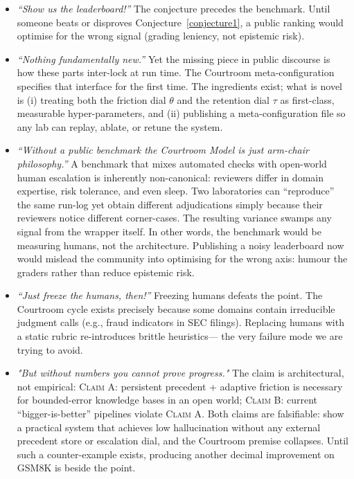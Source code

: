 \documentclass[11pt]{article}
\begin{document}
\begin{itemize}
\item \emph{“Show us the leaderboard!”} The conjecture precedes the benchmark. Until someone beats or disproves Conjecture~\ref{conjecture1}, a public ranking would optimise for the wrong signal (grading leniency, not epistemic risk).

\item \emph{“Nothing fundamentally new.”} Yet the missing piece in public discourse is how these parts inter-lock at run time. The Courtroom meta-configuration specifies that interface for the first time. The ingredients exist; what is novel is (i) treating both the friction dial $\theta$ and the retention dial $\tau$ as first-class, measurable hyper-parameters, and (ii) publishing a meta-configuration file so any lab can replay, ablate, or retune the system.

\item \emph{“Without a public benchmark the Courtroom Model is just arm-chair philosophy.”} A benchmark that mixes automated checks with open-world human escalation is inherently non-canonical: reviewers differ in domain expertise, risk tolerance, and even sleep. Two laboratories can “reproduce” the same run-log yet obtain different adjudications simply because their reviewers notice different corner-cases. The resulting variance swamps any signal from the wrapper itself. In other words, the benchmark would be measuring humans, not the architecture. Publishing a noisy leaderboard now would mislead the community into optimising for the wrong axis: humour the graders rather than reduce epistemic risk.

\item \emph{“Just freeze the humans, then!”} Freezing humans defeats the point. The Courtroom cycle exists precisely because some domains contain irreducible judgment calls (e.g., fraud indicators in SEC filings). Replacing humans with a static rubric re-introduces brittle heuristics— the very failure mode we are trying to avoid.

\item \emph{"But without numbers you cannot prove progress."} The claim is architectural, not empirical: \textsc{Claim A}: persistent precedent + adaptive friction is necessary for bounded-error knowledge bases in an open world; \textsc{Claim B}: current “bigger-is-better” pipelines violate \textsc{Claim A}. Both claims are falsifiable: show a practical system that achieves low hallucination without any external precedent store or escalation dial, and the Courtroom premise collapses. Until such a counter-example exists, producing another decimal improvement on GSM8K is beside the point.


\end{itemize}
\end{document}
